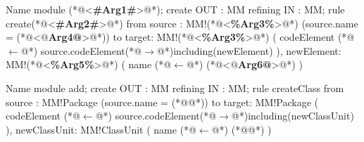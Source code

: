 \begin{codigo}[caption={[\textit{Template} ATL para realizar a operação atômica \textit{add}.] \textit{Template} ATL para realizar a operação atômica \textit{add}.},escapeinside={(*@}{@*)}, basicstyle=\footnotesize, label={codigo:template_addKDMElement}, language=ATL]{Name}
module (*@<\textbf{\#Arg1\#}>@*);
create OUT : MM refining IN : MM;
rule create(*@<\textbf{\#Arg2\#}>@*){
	from
		source : MM!(*@<\textbf{\%Arg3\%}>@*) (source.name = (*@<\textbf{$@$Arg4@}>@*))
	to 
		target: MM!(*@<\textbf{\%Arg3\%}>@*) (
			codeElement (*@$\leftarrow$@*) source.codeElement(*@$\rightarrow$@*)including(newElement)
		),
		newElement: MM!(*@<\textbf{\%Arg5\%}>@*) (
			name (*@$\leftarrow$@*) (*@<\textbf{$@$Arg6@}>@*)
		)
}
\end{codigo}




\begin{codigo}[caption={[ATL para realizar a operação atômica \textit{add} \texttt{ClassUnit}.] ATL para realizar a operação atômica \textit{add} \texttt{ClassUnit}.},escapeinside={(*@}{@*)}, basicstyle=\footnotesize, label={codigo:exemplo_add_classUnit}, language=ATL]{Name}
module add;
create OUT : MM refining IN : MM;
rule createClass{
	from
		source : MM!Package (source.name = (*@@*))
	to 
		target: MM!Package (
			codeElement (*@$\leftarrow$@*) source.codeElement(*@$\rightarrow$@*)including(newClassUnit)
		),
		newClassUnit: MM!ClassUnit (
			name (*@$\leftarrow$@*) (*@@*)
		)
}
\end{codigo}

